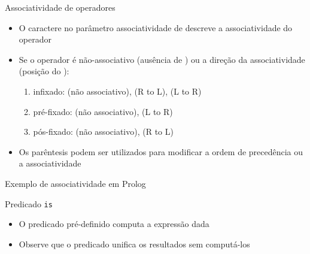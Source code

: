 \begin{frame}[fragile]{Associatividade de operadores}

    \begin{itemize}
        \item O caractere  no parâmetro associatividade de 
        descreve a associatividade do operador 

        \item Se o operador é não-associativo (ausência de ) ou a direção da 
            associatividade (posição do ):

        \begin{enumerate}
            \item infixado:  (não associativo),  (R to L),                 (L to R)
            \item pré-fixado:  (não associativo),  (L to 
                R)
            \item pós-fixado:  (não associativo),  (R to 
                L)
        \end{enumerate}

        \item Os parêntesis podem ser utilizados para modificar a ordem de precedência ou a associatividade
    \end{itemize}

\end{frame}

\begin{frame}[fragile]{Exemplo de associatividade em Prolog}
\end{frame}

\begin{frame}[fragile]{Predicado {\tt is}}

    \begin{itemize}
        \item O predicado pré-definido  computa a expressão dada


    \item Observe que o predicado  unifica os resultados sem computá-los

    \end{itemize}

\end{frame}

